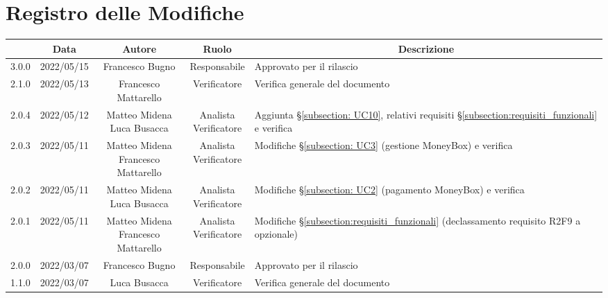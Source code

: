 \thispagestyle{empty}
\section*{Registro delle Modifiche}
\begin{center}
	\renewcommand{\arraystretch}{1.8}
	\begin{longtable}[c]{c | c | c | c | p{5cm}}
		\rowcolor[HTML]{125E28}
		\multicolumn{1}{c}{\color[HTML]{FFFFFF} \textbf{Versione}} &
		\multicolumn{1}{c}{\color[HTML]{FFFFFF} \textbf{Data}}     &
		\multicolumn{1}{c}{\color[HTML]{FFFFFF} \textbf{Autore}}   &
		\multicolumn{1}{c}{\color[HTML]{FFFFFF} \textbf{Ruolo}}    &
		\multicolumn{1}{c}{\color[HTML]{FFFFFF} \textbf{Descrizione}} \\
		\endhead
		3.0.0 & 2022/05/15 & Francesco Bugno & Responsabile & Approvato per il rilascio\\
		2.1.0 & 2022/05/13 &  Francesco Mattarello &  Verificatore & Verifica generale del documento \\
		2.0.4 & 2022/05/12 & \Longunderstack{Matteo Midena \\ Luca Busacca} & \Longunderstack{Analista \\ Verificatore} & Aggiunta §\ref{subsection: UC10}, relativi requisiti §\ref{subsection:requisiti_funzionali} e verifica \\
		2.0.3 & 2022/05/11 & \Longunderstack{Matteo Midena \\ Francesco Mattarello} & \Longunderstack{Analista \\ Verificatore} & Modifiche §\ref{subsection: UC3} (gestione MoneyBox) e verifica \\
		2.0.2 & 2022/05/11 & \Longunderstack{Matteo Midena \\ Luca Busacca} & \Longunderstack{Analista \\ Verificatore} & Modifiche §\ref{subsection: UC2} (pagamento MoneyBox) e verifica \\
		2.0.1 & 2022/05/11 & \Longunderstack{Matteo Midena \\ Francesco Mattarello} & \Longunderstack{Analista \\ Verificatore} & Modifiche §\ref{subsection:requisiti_funzionali} (declassamento requisito R2F9 a opzionale) \\
		2.0.0 & 2022/03/07 & Francesco Bugno & Responsabile & Approvato per il rilascio\\
		1.1.0 & 2022/03/07 & Luca Busacca & Verificatore & Verifica generale del documento\\

\end{longtable}
\end{center}
